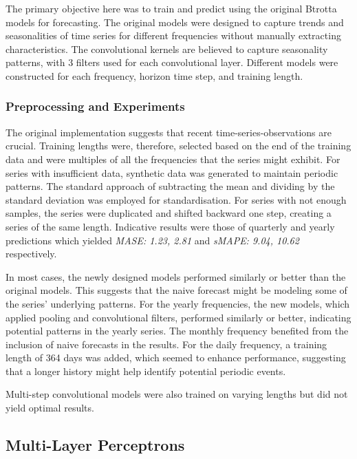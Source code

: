 \documentclass[conference]{IEEEtran}
\begin{document}
The primary objective here was to train and predict using the original Btrotta models\cite{cnn} for forecasting. The original models were designed to capture trends and seasonalities of time series for different frequencies without manually extracting characteristics. The convolutional kernels are believed to capture seasonality patterns, with 3 filters used for each convolutional layer. Different models were constructed for each frequency, horizon time step, and training length.

\subsubsection{Preprocessing and Experiments}

The original implementation suggests that recent time-series-observations are crucial. Training lengths were, therefore, selected based on the end of the training data and were multiples of all the frequencies that the series might exhibit. For series with insufficient data, synthetic data was generated to maintain periodic patterns. The standard approach of subtracting the mean and dividing by the standard deviation was employed for standardisation. For series with not enough samples, the series were duplicated and shifted backward one step, creating a series of the same length. Indicative results were those of quarterly and yearly predictions which yielded \textit{MASE: 1.23, 2.81} and \textit{sMAPE: 9.04, 10.62} respectively.

In most cases, the newly designed models performed similarly or better than the original models. This suggests that the naive forecast might be modeling some of the series' underlying patterns. For the yearly frequencies, the new models, which applied pooling and convolutional filters, performed similarly or better, indicating potential patterns in the yearly series. The monthly frequency benefited from the inclusion of naive forecasts in the results. For the daily frequency, a training length of 364 days was added, which seemed to enhance performance, suggesting that a longer history might help identify potential periodic events.

Multi-step convolutional models were also trained on varying lengths but did not yield optimal results.

\subsection{Multi-Layer Perceptrons}
\end{document}
